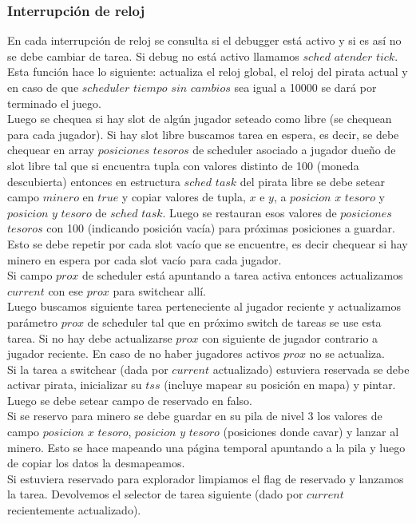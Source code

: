 \subsubsection{Interrupción de reloj}
En cada interrupción de reloj se consulta si el debugger está activo y si es así no se debe cambiar de tarea.
Si debug no está activo llamamos $sched$ $atender$ $tick$. Esta función hace lo siguiente: actualiza el
reloj global, el reloj del pirata actual y en caso de que $scheduler$ $tiempo$ $sin$ $cambios$ sea igual a
10000 se dará por terminado el juego.\\
Luego se chequea si hay slot de algún jugador seteado como libre
(se chequean para cada jugador). 
Si hay slot libre buscamos tarea en espera, es decir, se debe chequear en array $posiciones$ $tesoros$ de 
scheduler asociado a jugador dueño de slot libre tal que si encuentra tupla con valores distinto de 100 (moneda descubierta) entonces 
en estructura $sched$ $task$ del pirata libre se debe setear campo $minero$ en $true$ y copiar valores de tupla, $x$ e $y$, 
a $posicion$ $x$ $tesoro$ y $posicion$ $y$ $tesoro$ de $sched$ $task$. Luego se restauran esos valores de
 $posiciones$ $tesoros$ con 100 (indicando posición vacía) para próximas posiciones a guardar.
Esto se debe repetir por cada slot vacío que se encuentre, es decir chequear si hay minero en espera por cada 
slot vacío para cada jugador.\\

Si campo $prox$ de scheduler está apuntando a tarea activa entonces actualizamos $current$ con ese $prox$ para
switchear allí.\\
 
Luego buscamos siguiente tarea perteneciente al jugador reciente y actualizamos parámetro $prox$ de scheduler tal 
que en próximo switch de tareas se use esta tarea. Si no hay debe actualizarse $prox$ con siguiente de 
jugador contrario a jugador reciente. En caso de no haber jugadores activos $prox$ no se actualiza.\\

Si la tarea a switchear (dada por $current$ actualizado) estuviera reservada se debe activar pirata, inicializar 
su $tss$ (incluye mapear su posición en mapa) y pintar. Luego se debe setear campo de reservado en falso.\\
Si se reservo para minero se debe guardar en su pila de nivel $3$ los valores de campo $posicion$ $x$ $tesoro$, 
$posicion$ $y$ $tesoro$ (posiciones donde cavar) y lanzar al minero. Esto se hace mapeando una página temporal apuntando a la pila y luego de copiar los datos la desmapeamos.\\
Si estuviera reservado para explorador limpiamos el flag de reservado y lanzamos la tarea.
Devolvemos el selector de tarea siguiente (dado por $current$ recientemente actualizado).\\

